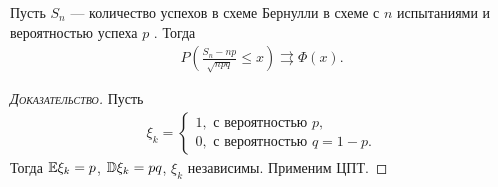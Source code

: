 \documentclass[../main.tex]{subfiles}
\begin{document}
\begin{crly}
 Пусть $ S_n  $ --- количество успехов в схеме Бернулли в схеме с  $ n $  испытаниями и вероятностью успеха $ p $ . Тогда
 \begin{align*}
  P \left( \frac{S_n - np}{\sqrt{npq}} \leqslant x \right) \rightrightarrows \Phi(x).
 \end{align*}
\end{crly}
\begin{proof}[\normalfont\textsc{Доказательство}]
 Пусть
 \begin{align*}
  \xi_k = \begin{cases}
   1, \text{ с вероятностью } p, \\
   0, \text{ с вероятностью } q = 1 - p.
  \end{cases}
 \end{align*} Тогда $ \mathbb E \xi_k = p $, $ \mathbb D \xi_k = pq $, $ \xi_k $ независимы. Применим ЦПТ.
\end{proof}
\end{document}
